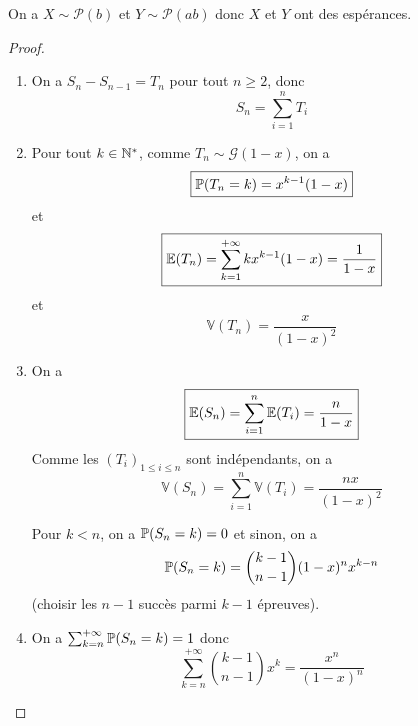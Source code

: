 \begin{remark}
    On a $X\sim \mathcal{P}(b)$ et $Y\sim\mathcal{P}(ab)$ donc $X$ et $Y$ ont des espérances.
\end{remark}

\begin{proof}
    \phantom{}
    \begin{enumerate}
        \item On a $S_{n}-S_{n-1}=T_{n}$ pour tout $n\geqslant2$, donc 
        \begin{equation}
            \boxed{S_{n}=\sum_{i=1}^{n}T_{i}}
        \end{equation}

        \item Pour tout $k\in\N^{*}$, comme $T_{n}\sim\mathcal{G}(1-x)$, on a 
        \begin{equation}
            \boxed{\P(T_{n}=k)=x^{k-1}(1-x)}
        \end{equation}
        et 
        \begin{equation}
            \boxed{\E(T_{n})=\sum_{k=1}^{+\infty}kx^{k-1}(1-x)=\frac{1}{1-x}}
        \end{equation}
        et 
        \begin{equation}
            \boxed{\mathbb{V}(T_{n})=\frac{x}{(1-x)^{2}}}
        \end{equation}

        \item On a
        \begin{equation}
            \boxed{\E(S_{n})=\sum_{i=1}^{n}\E(T_{i})=\frac{n}{1-x}}
        \end{equation}
        Comme les $(T_{i})_{1\leqslant i\leqslant n}$ sont indépendants, on a 
        \begin{equation}
            \boxed{\mathbb{V}(S_{n})=\sum_{i=1}^{n}\mathbb{V}(T_{i})=\frac{nx}{(1-x)^{2}}}
        \end{equation}

        Pour $k<n$, on a $\P(S_{n}=k)=0$ et sinon, on a 
        \begin{equation}
            \P(S_{n}=k)=\binom{k-1}{n-1}(1-x)^{n}x^{k-n}
        \end{equation}
        (choisir les $n-1$ succès parmi $k-1$ épreuves).

        \item On a $\sum_{k=n}^{+\infty}\P(S_{n}=k)=1$ donc 
        \begin{equation}
            \boxed{\sum_{k=n}^{+\infty}\binom{k-1}{n-1}x^{k}=\frac{x^{n}}{(1-x)^{n}}}
        \end{equation}
    \end{enumerate}
\end{proof}

